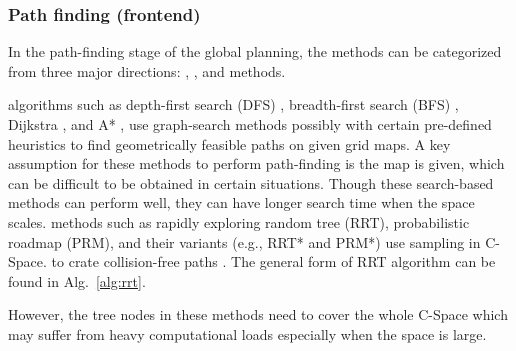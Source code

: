 \documentclass[letterpaper,journal,twoside]{IEEEtran}
\begin{document}
\subsubsection{Path finding (frontend)}

In the path-finding stage of the global planning, 
the methods can be categorized 
from three major directions: , 
, and  methods. 


% 
 algorithms such as depth-first 
search (DFS) \cite{cormen2022introduction}, 
breadth-first search (BFS) \cite{cormen2022introduction}, 
Dijkstra \cite{wang2011application}, and 
A* \cite{hart1968formal}, use graph-search methods 
possibly with certain pre-defined heuristics to find 
geometrically feasible paths on given grid maps. 
A key assumption for these methods to perform path-finding 
is the map is given, which can be difficult to be obtained 
in certain situations. 
Though these search-based methods can perform well, they 
can have longer search time when the space scales.
 methods such as rapidly exploring random 
tree (RRT), probabilistic roadmap (PRM), and their 
variants (e.g., RRT* and PRM*) use sampling in C-Space. 
to crate collision-free paths \cite{lavalle2001rapidly,
karaman2011sampling,kavraki1996probabilistic}. 
The general form of RRT algorithm can be found in 
Alg.~\ref{alg:rrt}.

However, the tree nodes in these methods need to cover the 
whole C-Space which may suffer from heavy computational 
loads especially when the space is large.  
\end{document}
